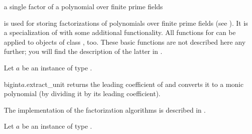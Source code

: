 


\NAME

 \dotfill a single factor of
a polynomial over finite prime fields



\ABSTRACT

 is used for storing factorizations of polynomials over
finite prime fields (see ).  It is a specialization of  with some additional functionality.  All functions for  can be
applied to objects of class , too.  These basic functions
are not described here any further; you will find the description of the latter in
.



\DESCRIPTION





Let $a$ be an instance of type .

\begin{fcode}{bigint}{$a$.extract_unit}{}
  returns the leading coefficient of  and converts it to a monic polynomial (by
  dividing it by its leading coefficient).
\end{fcode}



The implementation of the factorization algorithms is described in \cite{Pfahler_Thesis:1998}.

Let $a$ be an instance of type .

